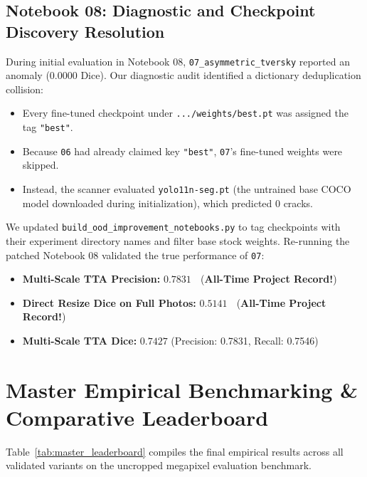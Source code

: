\documentclass[11pt,a4paper]{article}
\begin{document}
\subsection{Notebook 08: Diagnostic and Checkpoint Discovery Resolution}
During initial evaluation in Notebook 08, \texttt{07\_asymmetric\_tversky} reported an anomaly ($0.0000$ Dice). 
Our diagnostic audit identified a dictionary deduplication collision:
\begin{itemize}[leftmargin=1.5em]
  \item Every fine-tuned checkpoint under \texttt{.../weights/best.pt} was assigned the tag \texttt{"best"}. 
  \item Because \texttt{06} had already claimed key \texttt{"best"}, \texttt{07}'s fine-tuned weights were skipped. 
  \item Instead, the scanner evaluated \texttt{yolo11n-seg.pt} (the untrained base COCO model downloaded during initialization), which predicted 0 cracks.
\end{itemize}
We updated \texttt{build\_ood\_improvement\_notebooks.py} to tag checkpoints with their experiment directory names and filter base stock weights. 
Re-running the patched Notebook 08 validated the true performance of \texttt{07}:
\begin{itemize}[leftmargin=1.5em]
  \item \textbf{Multi-Scale TTA Precision:} $\mathbf{0.7831}$ 👑 (\textbf{All-Time Project Record!})
  \item \textbf{Direct Resize Dice on Full Photos:} $\mathbf{0.5141}$ 👑 (\textbf{All-Time Project Record!})
  \item \textbf{Multi-Scale TTA Dice:} $\mathbf{0.7427}$ (Precision: 0.7831, Recall: 0.7546)
\end{itemize}

\section{Master Empirical Benchmarking \& Comparative Leaderboard}
\label{sec:benchmark}

Table~\ref{tab:master_leaderboard} compiles the final empirical results across all validated variants on the uncropped megapixel evaluation benchmark.
\end{document}
